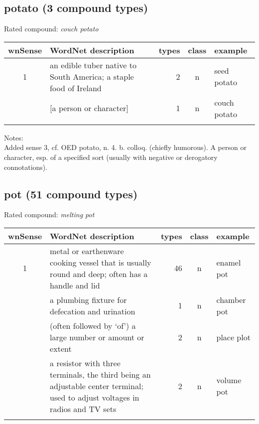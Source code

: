 \subsection{potato    (3 compound types)}
Rated compound: \emph{couch potato}

\vspace*{-.2cm}

\noindent
\begin{longtable}{c>{\raggedright\arraybackslash}p{5cm}rc>{\raggedright\arraybackslash}p{2cm}}\lsptoprule
{\small wnSense}&WordNet description&types&class&example\\\midrule
1&an edible tuber native to South America; a staple food of Ireland&2&n&seed potato\\\tablevspace
3&{}[a person or character]&1&n&couch potato\\\lspbottomrule
\end{longtable}

\noindent
Notes:\\
Added sense 3, cf. OED potato, n. 4. b. colloq. (chiefly humorous). A person or character, esp. of a specified sort (usually with negative or derogatory connotations).
\subsection{pot       (51 compound types)}
Rated compound: \emph{melting pot}

\vspace*{-.2cm}

\noindent
\begin{longtable}{c>{\raggedright\arraybackslash}p{5cm}rc>{\raggedright\arraybackslash}p{2cm}}\lsptoprule
{\small wnSense}&WordNet description&types&class&example\\\midrule
1&metal or earthenware cooking vessel that is usually round and deep; often has a handle and lid&46&n&enamel pot\\\tablevspace
2&a plumbing fixture for defecation and urination&1&n&chamber pot\\\tablevspace
5&(often followed by `of') a large number or amount or extent&2&n&place plot\\\tablevspace
8&a resistor with three terminals, the third being an adjustable center terminal; used to adjust voltages in radios and TV sets&2&n&volume pot\\\lspbottomrule
\end{longtable}
\vspace*{-.2cm}

